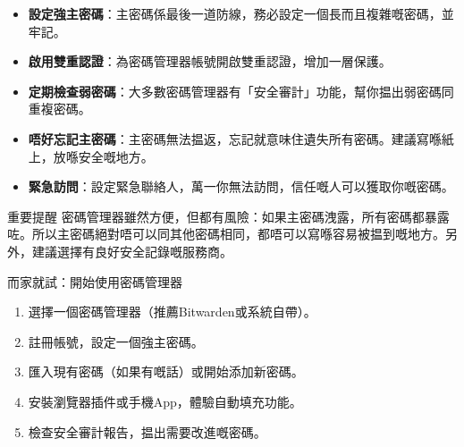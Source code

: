 
\begin{itemize}
  \item \textbf{設定強主密碼}：主密碼係最後一道防線，務必設定一個長而且複雜嘅密碼，並牢記。
  \item \textbf{啟用雙重認證}：為密碼管理器帳號開啟雙重認證，增加一層保護。
  \item \textbf{定期檢查弱密碼}：大多數密碼管理器有「安全審計」功能，幫你揾出弱密碼同重複密碼。
  \item \textbf{唔好忘記主密碼}：主密碼無法揾返，忘記就意味住遺失所有密碼。建議寫喺紙上，放喺安全嘅地方。
  \item \textbf{緊急訪問}：設定緊急聯絡人，萬一你無法訪問，信任嘅人可以獲取你嘅密碼。
\end{itemize}

\begin{tcbwarn}{重要提醒}
密碼管理器雖然方便，但都有風險：如果主密碼洩露，所有密碼都暴露咗。所以主密碼絕對唔可以同其他密碼相同，都唔可以寫喺容易被揾到嘅地方。另外，建議選擇有良好安全記錄嘅服務商。

\end{tcbwarn}

\begin{tcbpractice}{而家就試：開始使用密碼管理器}
\begin{enumerate}
  \item 選擇一個密碼管理器（推薦Bitwarden或系統自帶）。
  \item 註冊帳號，設定一個強主密碼。
  \item 匯入現有密碼（如果有嘅話）或開始添加新密碼。
  \item 安裝瀏覽器插件或手機App，體驗自動填充功能。
  \item 檢查安全審計報告，揾出需要改進嘅密碼。
\end{enumerate}

\end{tcbpractice}
